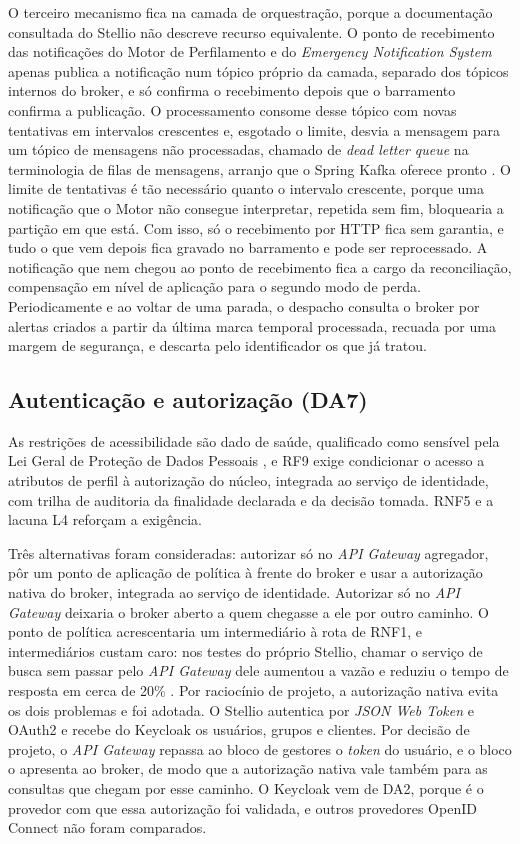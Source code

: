 O terceiro mecanismo fica na camada de orquestração, porque a documentação consultada do Stellio não descreve recurso equivalente. O ponto de recebimento das notificações do Motor de Perfilamento e do \textit{Emergency Notification System} apenas publica a notificação num tópico próprio da camada, separado dos tópicos internos do broker, e só confirma o recebimento depois que o barramento confirma a publicação. O processamento consome desse tópico com novas tentativas em intervalos crescentes e, esgotado o limite, desvia a mensagem para um tópico de mensagens não processadas, chamado de \textit{dead letter queue} na terminologia de filas de mensagens, arranjo que o Spring Kafka oferece pronto \cite{springkafka2026docs}. O limite de tentativas é tão necessário quanto o intervalo crescente, porque uma notificação que o Motor não consegue interpretar, repetida sem fim, bloquearia a partição em que está. Com isso, só o recebimento por HTTP fica sem garantia, e tudo o que vem depois fica gravado no barramento e pode ser reprocessado. A notificação que nem chegou ao ponto de recebimento fica a cargo da reconciliação, compensação em nível de aplicação para o segundo modo de perda. Periodicamente e ao voltar de uma parada, o despacho consulta o broker por alertas criados a partir da última marca temporal processada, recuada por uma margem de segurança, e descarta pelo identificador os que já tratou.

\subsection{Autenticação e autorização (DA7)}

As restrições de acessibilidade são dado de saúde, qualificado como sensível pela Lei Geral de Proteção de Dados Pessoais \cite{brasil2018lgpd}, e RF9 exige condicionar o acesso a atributos de perfil à autorização do núcleo, integrada ao serviço de identidade, com trilha de auditoria da finalidade declarada e da decisão tomada. RNF5 e a lacuna L4 reforçam a exigência.

Três alternativas foram consideradas: autorizar só no \textit{API Gateway} agregador, pôr um ponto de aplicação de política à frente do broker e usar a autorização nativa do broker, integrada ao serviço de identidade. Autorizar só no \textit{API Gateway} deixaria o broker aberto a quem chegasse a ele por outro caminho. O ponto de política acrescentaria um intermediário à rota de RNF1, e intermediários custam caro: nos testes do próprio Stellio, chamar o serviço de busca sem passar pelo \textit{API Gateway} dele aumentou a vazão e reduziu o tempo de resposta em cerca de 20\% \cite{stellio2025docs}. Por raciocínio de projeto, a autorização nativa evita os dois problemas e foi adotada. O Stellio autentica por \textit{JSON Web Token} e OAuth2 e recebe do Keycloak os usuários, grupos e clientes. Por decisão de projeto, o \textit{API Gateway} repassa ao bloco de gestores o \textit{token} do usuário, e o bloco o apresenta ao broker, de modo que a autorização nativa vale também para as consultas que chegam por esse caminho. O Keycloak \cite{keycloak2025} vem de DA2, porque é o provedor com que essa autorização foi validada, e outros provedores OpenID Connect não foram comparados.

